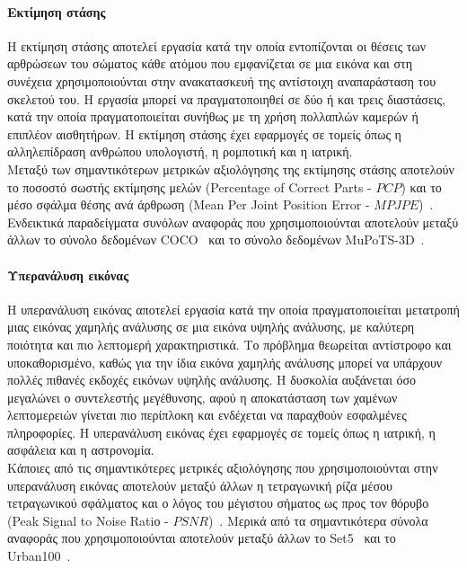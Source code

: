 \documentclass[12pt]{article}
\numberwithin{equation}{section}
\begin{document}
\paragraph{Εκτίμηση στάσης\\ [0.5 cm]}

Η εκτίμηση στάσης αποτελεί εργασία κατά την οποία εντοπίζονται οι θέσεις των αρθρώσεων του σώματος κάθε ατόμου που εμφανίζεται σε μια εικόνα και στη συνέχεια χρησιμοποιούνται στην ανακατασκευή της αντίστοιχη αναπαράσταση του σκελετού του. Η εργασία μπορεί να πραγματοποιηθεί σε δύο ή και τρεις διαστάσεις, κατά την οποία πραγματοποιείται συνήθως με τη χρήση πολλαπλών καμερών ή επιπλέον αισθητήρων. Η εκτίμηση στάσης έχει εφαρμογές σε τομείς όπως η αλληλεπίδραση ανθρώπου υπολογιστή, η ρομποτική και η ιατρική.\\

Μεταξύ των σημαντικότερων μετρικών αξιολόγησης της εκτίμησης στάσης αποτελούν το ποσοστό σωστής εκτίμησης μελών (Percentage of Correct Parts - \(PCP\)) και το μέσο σφάλμα θέσης ανά άρθρωση (Mean Per Joint Position Error - \(MPJPE\))~\cite{zheng2023deeplearningbasedhumanpose}. Ενδεικτικά παραδείγματα συνόλων αναφοράς που χρησιμοποιούνται αποτελούν μεταξύ άλλων το σύνολο δεδομένων COCO~\cite{lin2015microsoftcococommonobjects} και το σύνολο δεδομένων MuPoTS-3D~\cite{mehta2018singleshotmultiperson3dpose}.\\

\paragraph{Υπερανάλυση εικόνας \\ [0.5 cm]}

Η υπερανάλυση εικόνας αποτελεί εργασία κατά την οποία πραγματοποιείται μετατροπή μιας εικόνας χαμηλής ανάλυσης σε μια εικόνα υψηλής ανάλυσης, με καλύτερη ποιότητα και πιο λεπτομερή χαρακτηριστικά. Το πρόβλημα θεωρείται αντίστροφο και υποκαθορισμένο, καθώς για την ίδια εικόνα χαμηλής ανάλυσης μπορεί να υπάρχουν πολλές πιθανές εκδοχές εικόνων υψηλής ανάλυσης. Η δυσκολία αυξάνεται όσο μεγαλώνει ο συντελεστής μεγέθυνσης, αφού η αποκατάσταση των χαμένων λεπτομερειών γίνεται πιο περίπλοκη και ενδέχεται να παραχθούν εσφαλμένες πληροφορίες. Η υπερανάλυση εικόνας έχει εφαρμογές σε τομείς όπως η ιατρική, η ασφάλεια και η αστρονομία.\\

Κάποιες από τις σημαντικότερες μετρικές αξιολόγησης που χρησιμοποιούνται στην υπερανάλυση εικόνας αποτελούν μεταξύ άλλων η τετραγωνική ρίζα μέσου τετραγωνικού σφάλματος και ο λόγος του μέγιστου σήματος ως προς τον θόρυβο (Peak Signal to Noise Ratiο - \(PSNR\))~\cite{anwar2020deepjourneysuperresolutionsurvey}. Μερικά από τα σημαντικότερα σύνολα αναφοράς που χρησιμοποιούνται αποτελούν μεταξύ άλλων το Set5~\cite{article11} και το Urban100~\cite{7299156}.\\
\end{document}
